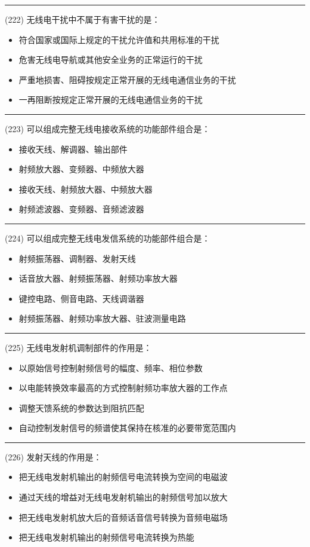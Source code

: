 \documentclass[twocolumn]{ctexart}  %
\begin{document}
\noindent\rule{0.5\textwidth}{1pt}
\heiti (222) 无线电干扰中不属于有害干扰的是： \songti {\color{gray} [LK0138] }
\begin{itemize}
	\item  符合国家或国际上规定的干扰允许值和共用标准的干扰
	\item  危害无线电导航或其他安全业务的正常运行的干扰
	\item  严重地损害、阻碍按规定正常开展的无线电通信业务的干扰
	\item  一再阻断按规定正常开展的无线电通信业务的干扰
\end{itemize}


\noindent\rule{0.5\textwidth}{1pt}
\heiti (223) 可以组成完整无线电接收系统的功能部件组合是： \songti {\color{gray} [LK0416] }
\begin{itemize}
	\item  接收天线、解调器、输出部件
	\item  射频放大器、变频器、中频放大器
	\item  接收天线、射频放大器、中频放大器
	\item  射频滤波器、变频器、音频滤波器
\end{itemize}


\noindent\rule{0.5\textwidth}{1pt}
\heiti (224) 可以组成完整无线电发信系统的功能部件组合是： \songti {\color{gray} [LK0417] }
\begin{itemize}
	\item  射频振荡器、调制器、发射天线
	\item  话音放大器、射频振荡器、射频功率放大器
	\item  键控电路、侧音电路、天线调谐器
	\item  射频振荡器、射频功率放大器、驻波测量电路
\end{itemize}


\noindent\rule{0.5\textwidth}{1pt}
\heiti (225) 无线电发射机调制部件的作用是： \songti {\color{gray} [LK0418] }
\begin{itemize}
	\item  以原始信号控制射频信号的幅度、频率、相位参数
	\item  以电能转换效率最高的方式控制射频功率放大器的工作点
	\item  调整天馈系统的参数达到阻抗匹配
	\item  自动控制发射信号的频谱使其保持在核准的必要带宽范围内
\end{itemize}


\noindent\rule{0.5\textwidth}{1pt}
\heiti (226) 发射天线的作用是： \songti {\color{gray} [LK0420] }
\begin{itemize}
	\item  把无线电发射机输出的射频信号电流转换为空间的电磁波
	\item  通过天线的增益对无线电发射机输出的射频信号加以放大
	\item  把无线电发射机放大后的音频话音信号转换为音频电磁场
	\item  把无线电发射机输出的射频信号电流转换为热能
\end{itemize}
\end{document}
